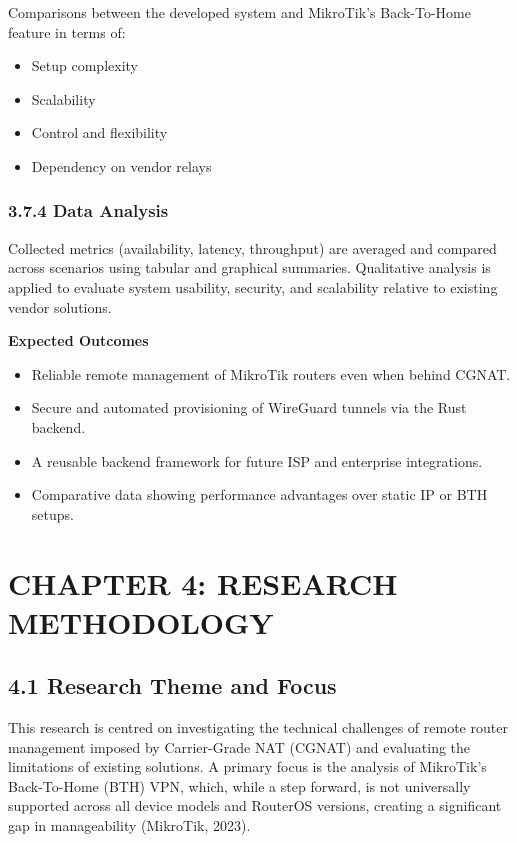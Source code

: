 \documentclass[12pt,a4paper,oneside]{report}
\begin{document}
Comparisons between the developed system and MikroTik's Back-To-Home feature in terms of:

\begin{itemize}
  \item Setup complexity
  \item Scalability
  \item Control and flexibility
  \item Dependency on vendor relays
\end{itemize}

\subsection{3.7.4 Data Analysis}

Collected metrics (availability, latency, throughput) are averaged and compared across scenarios using tabular and graphical summaries. Qualitative analysis is applied to evaluate system usability, security, and scalability relative to existing vendor solutions.

\textbf{Expected Outcomes}

\begin{itemize}
  \item Reliable remote management of MikroTik routers even when behind CGNAT.
  \item Secure and automated provisioning of WireGuard tunnels via the Rust backend.
  \item A reusable backend framework for future ISP and enterprise integrations.
  \item Comparative data showing performance advantages over static IP or BTH setups.
\end{itemize}

\chapter{CHAPTER 4: RESEARCH METHODOLOGY}

\section{4.1 Research Theme and Focus}

This research is centred on investigating the technical challenges of remote router management imposed by Carrier-Grade NAT (CGNAT) and evaluating the limitations of existing solutions. A primary focus is the analysis of MikroTik's Back-To-Home (BTH) VPN, which, while a step forward, is not universally supported across all device models and RouterOS versions, creating a significant gap in manageability (MikroTik, 2023).
\end{document}
